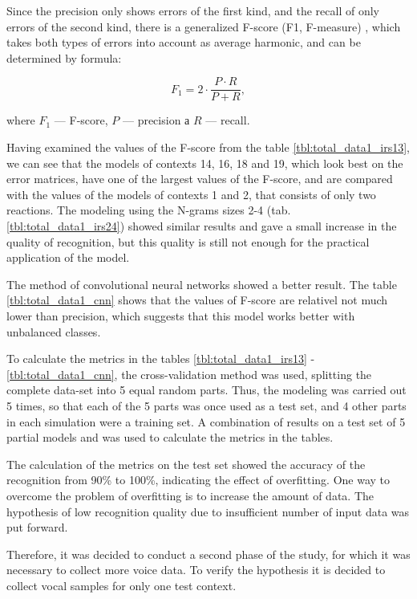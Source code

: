 Since the precision only shows errors of the first kind, and the recall of only errors of the second kind, there is a generalized F-score (F1, F-measure) \cite{Powers_2011, Sasaki_2007}, which takes both types of errors into account as average harmonic, and can be determined by formula:

\begin{equation}
\label{eq:f1}
F_1 = 2 \cdot \frac{P \cdot R}{P + R},
\end{equation}

where $F_1$ --- F-score, $P$ --- precision а $R$ --- recall.

Having examined the values of the F-score from the table \ref{tbl:total_data1_irs13}, we can see that the models of contexts 14, 16, 18 and 19, which look best on the error matrices, have one of the largest values of the F-score, and are compared with the values of the models of contexts 1 and 2, that consists of only two reactions. The modeling using the N-grams sizes 2-4 (tab. \ref{tbl:total_data1_irs24}) showed similar results and gave a small increase in the quality of recognition, but this quality is still not enough for the practical application of the model.

The method of convolutional neural networks showed a better result. The table \ref{tbl:total_data1_cnn} shows that the values of F-score are relativel not much lower than precision, which suggests that this model works better with unbalanced classes.

To calculate the metrics in the tables \ref{tbl:total_data1_irs13} - \ref{tbl:total_data1_cnn}, the cross-validation method \cite{Kohavi_1995} was used, splitting the complete data-set into 5 equal random parts. Thus, the modeling was carried out 5 times, so that each of the 5 parts was once used as a test set, and 4 other parts in each simulation were a training set. A combination of results on a test set of 5 partial models and was used to calculate the metrics in the tables.

The calculation of the metrics on the test set showed the accuracy of the recognition from 90\% to 100\%, indicating the effect of overfitting. One way to overcome the problem of overfitting is to increase the amount of data. The hypothesis of low recognition quality due to insufficient number of input data was put forward.

Therefore, it was decided to conduct a second phase of the study, for which it was necessary to collect more voice data. To verify the hypothesis it is decided to collect vocal samples for only one test context.

